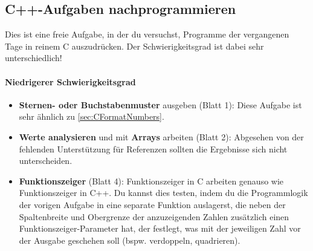\subsection{C++-Aufgaben nachprogrammieren \optional}

\optionaltextbox

Dies ist eine freie Aufgabe, in der du versuchst, Programme der vergangenen Tage in reinem C auszudrücken.
Der Schwierigkeitsgrad ist dabei sehr unterschiedlich!

\paragraph{Niedrigerer Schwierigkeitsgrad}
\begin{itemize}
\item
\textbf{Sternen- oder Buchstabenmuster} ausgeben (Blatt 1):
Diese Aufgabe ist sehr ähnlich zu \cref{sec:CFormatNumbers}.

\item
\textbf{Werte analysieren} und mit \textbf{Arrays} arbeiten (Blatt 2):
Abgesehen von der fehlenden Unterstützung für Referenzen sollten die Ergebnisse sich nicht unterscheiden.

\item
\textbf{Funktionszeiger} (Blatt 4):
Funktionszeiger in C arbeiten genauso wie Funktionszeiger in C++.
Du kannst dies testen, indem du die Programmlogik der vorigen Aufgabe in eine separate Funktion auslagerst, die neben der Spaltenbreite und Obergrenze der anzuzeigenden Zahlen zusätzlich einen Funktionszeiger-Parameter hat, der festlegt, was mit der jeweiligen Zahl vor der Ausgabe geschehen soll (bspw. verdoppeln, quadrieren).
\end{itemize}
